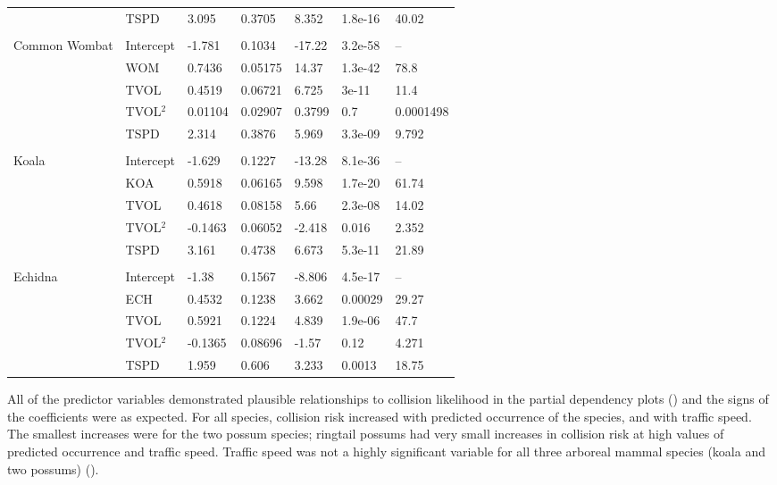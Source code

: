 \begin{table}[htp]
\begin{tabularx}{\textwidth}{lllllll}
   & TSPD & 3.095 & 0.3705 & 8.352 & 1.8e-16 & 40.02 \\ 
   &  &  &  &  &  &  \\ 
Common Wombat & Intercept & -1.781 & 0.1034 & -17.22 & 3.2e-58 & -- \\ 
   & WOM & 0.7436 & 0.05175 & 14.37 & 1.3e-42 & 78.8 \\ 
   & TVOL & 0.4519 & 0.06721 & 6.725 & 3e-11 & 11.4 \\ 
   & TVOL$^2$ & 0.01104 & 0.02907 & 0.3799 & 0.7 & 0.0001498 \\ 
   & TSPD & 2.314 & 0.3876 & 5.969 & 3.3e-09 & 9.792 \\ 
   &  &  &  &  &  &  \\ 
Koala & Intercept & -1.629 & 0.1227 & -13.28 & 8.1e-36 & -- \\ 
   & KOA & 0.5918 & 0.06165 & 9.598 & 1.7e-20 & 61.74 \\ 
   & TVOL & 0.4618 & 0.08158 & 5.66 & 2.3e-08 & 14.02 \\ 
   & TVOL$^2$ & -0.1463 & 0.06052 & -2.418 & 0.016 & 2.352 \\ 
   & TSPD & 3.161 & 0.4738 & 6.673 & 5.3e-11 & 21.89 \\ 
   &  &  &  &  &  &  \\ 
Echidna & Intercept & -1.38 & 0.1567 & -8.806 & 4.5e-17 & -- \\ 
   & ECH & 0.4532 & 0.1238 & 3.662 & 0.00029 & 29.27 \\ 
   & TVOL & 0.5921 & 0.1224 & 4.839 & 1.9e-06 & 47.7 \\ 
   & TVOL$^2$ & -0.1365 & 0.08696 & -1.57 & 0.12 & 4.271 \\ 
   & TSPD & 1.959 & 0.606 & 3.233 & 0.0013 & 18.75 \\  
\bottomrule
\end{tabularx}
\label{6sp_sum_coll}
\end{table}

All of the predictor variables demonstrated plausible relationships to collision likelihood in the partial dependency plots () and the signs of the coefficients were as expected. For all species, collision risk increased with predicted occurrence of the species, and with traffic speed. The smallest increases were for the two possum species; ringtail possums had very small increases in collision risk at high values of predicted occurrence and traffic speed.  Traffic speed was not a highly significant variable for all three arboreal mammal species (koala and two possums) ().

